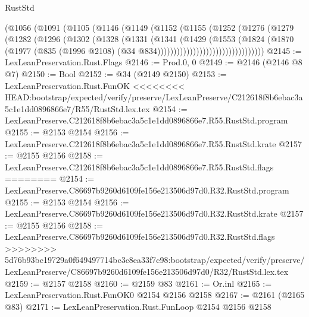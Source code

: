\begin{lexlean}{RustStd}
\begin{coremodule}
{\begin{coremodule}
{{{{{{{{{{                        (@1056
                          (@1091
                            (@1105
                              (@1146
                                (@1149
                                  (@1152
                                    (@1155
                                      (@1252
                                        (@1276
                                          (@1279
                                            (@1282
                                              (@1296
                                                (@1302
                                                  (@1328
                                                    (@1331
                                                      (@1341
                                                        (@1429
                                                          (@1553
                                                            (@1824
                                                              (@1870
                                                                (@1977
                                                                  (@835
                                                                    (@1996 @2108)
                                                                    (@34
                                                                      @834)))))))))))))))))))))))))))))))))
@2145 := LexLeanPreservation.Rust.Flags
@2146 := Prod.{0, 0}
@2149 := @2146 (@2146 @8 @7)
@2150 := Bool
@2152 := @34 (@2149 @2150)
@2153 := LexLeanPreservation.Rust.FunOK
<<<<<<<< HEAD:bootstrap/expected/verify/preserve/LexLeanPreserve/C212618f8b6ebac3a5c1e1dd0896866e7/R55/RustStd.lex.tex
@2154 := LexLeanPreserve.C212618f8b6ebac3a5c1e1dd0896866e7.R55.RustStd.program
@2155 := @2153 @2154
@2156 := LexLeanPreserve.C212618f8b6ebac3a5c1e1dd0896866e7.R55.RustStd.krate
@2157 := @2155 @2156
@2158 := LexLeanPreserve.C212618f8b6ebac3a5c1e1dd0896866e7.R55.RustStd.flags
========
@2154 := LexLeanPreserve.C86697b9260d6109fe156e213506d97d0.R32.RustStd.program
@2155 := @2153 @2154
@2156 := LexLeanPreserve.C86697b9260d6109fe156e213506d97d0.R32.RustStd.krate
@2157 := @2155 @2156
@2158 := LexLeanPreserve.C86697b9260d6109fe156e213506d97d0.R32.RustStd.flags
>>>>>>>> 5d76b93bc19729a0f649497714bc3c8ea33f7c98:bootstrap/expected/verify/preserve/LexLeanPreserve/C86697b9260d6109fe156e213506d97d0/R32/RustStd.lex.tex
@2159 := @2157 @2158
@2160 := @2159 @83
@2161 := Or.inl
@2165 := LexLeanPreservation.Rust.FunOK0 @2154 @2156 @2158
@2167 := @2161 (@2165 @83)
@2171 := LexLeanPreservation.Rust.FunLoop @2154 @2156 @2158
}}}}}}}}}}
\end{coremodule}}
\end{coremodule}
\end{lexlean}
